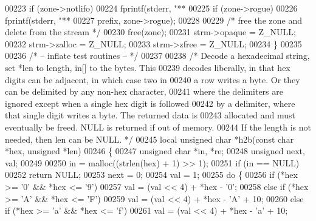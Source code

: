 \begin{DoxyCode}
{{{00223     \textcolor{keywordflow}{if} (zone->notlifo)
00224         fprintf(stderr, \textcolor{stringliteral}{"** %
00225     \textcolor{keywordflow}{if} (zone->rogue)
00226         fprintf(stderr, \textcolor{stringliteral}{"** %
00227                 prefix, zone->rogue);
00228 
00229     \textcolor{comment}{/* free the zone and delete from the stream */}
00230     free(zone);
00231     strm->opaque = Z\_NULL;
00232     strm->zalloc = Z\_NULL;
00233     strm->zfree = Z\_NULL;
00234 \}
00235 
00236 \textcolor{comment}{/* -- inflate test routines -- */}
00237 
00238 \textcolor{comment}{/* Decode a hexadecimal string, set *len to length, in[] to the bytes.  This}
00239 \textcolor{comment}{   decodes liberally, in that hex digits can be adjacent, in which case two in}
00240 \textcolor{comment}{   a row writes a byte.  Or they can be delimited by any non-hex character,}
00241 \textcolor{comment}{   where the delimiters are ignored except when a single hex digit is followed}
00242 \textcolor{comment}{   by a delimiter, where that single digit writes a byte.  The returned data is}
00243 \textcolor{comment}{   allocated and must eventually be freed.  NULL is returned if out of memory.}
00244 \textcolor{comment}{   If the length is not needed, then len can be NULL. */}
00245 local \textcolor{keywordtype}{unsigned} \textcolor{keywordtype}{char} *h2b(\textcolor{keyword}{const} \textcolor{keywordtype}{char} *hex, \textcolor{keywordtype}{unsigned} *len)
00246 \{
00247     \textcolor{keywordtype}{unsigned} \textcolor{keywordtype}{char} *in, *re;
00248     \textcolor{keywordtype}{unsigned} next, val;
00249 
00250     in = malloc((strlen(hex) + 1) >> 1);
00251     \textcolor{keywordflow}{if} (in == NULL)
00252         \textcolor{keywordflow}{return} NULL;
00253     next = 0;
00254     val = 1;
00255     \textcolor{keywordflow}{do} \{
00256         \textcolor{keywordflow}{if} (*hex >= \textcolor{charliteral}{'0'} && *hex <= \textcolor{charliteral}{'9'})
00257             val = (val << 4) + *hex - \textcolor{charliteral}{'0'};
00258         \textcolor{keywordflow}{else} \textcolor{keywordflow}{if} (*hex >= \textcolor{charliteral}{'A'} && *hex <= \textcolor{charliteral}{'F'})
00259             val = (val << 4) + *hex - \textcolor{charliteral}{'A'} + 10;
00260         \textcolor{keywordflow}{else} \textcolor{keywordflow}{if} (*hex >= \textcolor{charliteral}{'a'} && *hex <= \textcolor{charliteral}{'f'})
00261             val = (val << 4) + *hex - \textcolor{charliteral}{'a'} + 10;
}}}}}
\end{DoxyCode}
